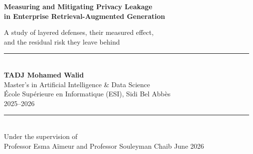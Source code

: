 \documentclass[11pt,a4paper]{article}
\title{}\author{}\date{}
\begin{document}
\begin{titlepage}
\centering
\vspace*{2.2cm}
{\Large\bfseries Measuring and Mitigating Privacy Leakage\\[4pt]
in Enterprise Retrieval-Augmented Generation\par}
\vspace{1.4cm}
{\large A study of layered defenses, their measured effect,\\ and the residual risk they leave behind\par}
\vspace{2.4cm}
{\rule{0.7\textwidth}{0.4pt}}\\[10pt]
{\large\bfseries TADJ Mohamed Walid}\\[6pt]
{\normalsize Master's in Artificial Intelligence \& Data Science}\\
{\normalsize \'Ecole Sup\'erieure en Informatique (ESI), Sidi Bel Abb\`es}\\
{\normalsize 2025--2026}\\[10pt]
{\rule{0.7\textwidth}{0.4pt}}\\[1.2cm]
{\normalsize Under the supervision of\\[2pt]
Professor Esma A\"imeur \quad and \quad Professor Souleyman Chaib}
\vfill
{\normalsize June 2026}
\end{titlepage}
\end{document}
